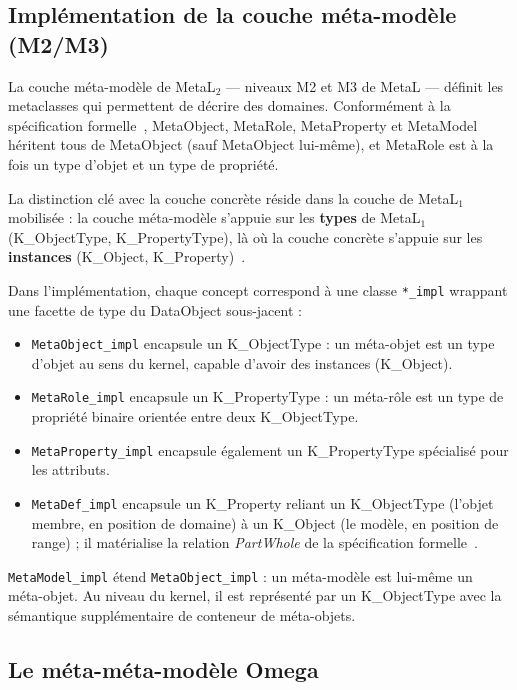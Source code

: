 \subsection{Implémentation de la couche méta-modèle (M2/M3)}
\label{sec:impl-metamodel}

La couche méta-modèle de MetaL$_2$ --- niveaux M2 et M3 de MetaL --- définit
les metaclasses qui permettent de décrire des domaines. Conformément à la
spécification formelle~\cite{englebert_metal2}, MetaObject, MetaRole, MetaProperty
et MetaModel héritent tous de MetaObject (sauf MetaObject lui-même), et MetaRole
est à la fois un type d'objet et un type de propriété.

La distinction clé avec la couche concrète réside dans la couche de MetaL$_1$
mobilisée : la couche méta-modèle s'appuie sur les \textbf{types} de MetaL$_1$
(K\_ObjectType, K\_PropertyType), là où la couche concrète s'appuie sur les
\textbf{instances} (K\_Object, K\_Property)~\cite{englebert_metal1}.

Dans l'implémentation, chaque concept correspond à une classe \texttt{*\_impl}
wrappant une facette de type du DataObject sous-jacent :

\begin{itemize}
  \item \texttt{MetaObject\_impl} encapsule un K\_ObjectType : un méta-objet est
    un type d'objet au sens du kernel, capable d'avoir des instances (K\_Object).
  \item \texttt{MetaRole\_impl} encapsule un K\_PropertyType : un méta-rôle est
    un type de propriété binaire orientée entre deux K\_ObjectType.
  \item \texttt{MetaProperty\_impl} encapsule également un K\_PropertyType
    spécialisé pour les attributs.
  \item \texttt{MetaDef\_impl} encapsule un K\_Property reliant un K\_ObjectType
    (l'objet membre, en position de domaine) à un K\_Object (le modèle, en position
    de range) ; il matérialise la relation \textit{PartWhole} de la spécification
    formelle~\cite{englebert_metal2}.
\end{itemize}

\texttt{MetaModel\_impl} étend \texttt{MetaObject\_impl} : un méta-modèle est
lui-même un méta-objet. Au niveau du kernel, il est représenté par un K\_ObjectType
avec la sémantique supplémentaire de conteneur de méta-objets.

\subsection{Le méta-méta-modèle Omega}

